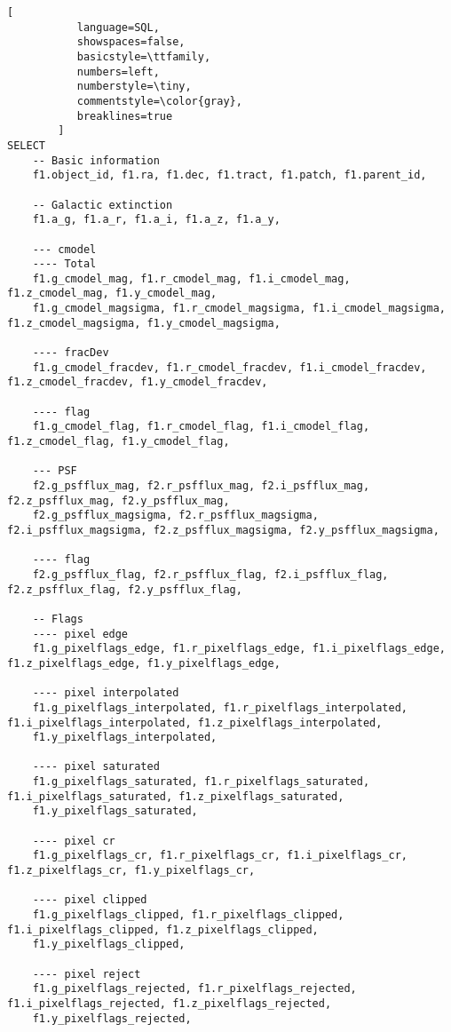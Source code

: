 \documentclass[fleqn,usenatbib,useAMS]{mnras}
\begin{document}
\begin{lstlisting}[
           language=SQL,
           showspaces=false,
           basicstyle=\ttfamily,
           numbers=left,
           numberstyle=\tiny,
           commentstyle=\color{gray},
           breaklines=true
        ]
SELECT
    -- Basic information
    f1.object_id, f1.ra, f1.dec, f1.tract, f1.patch, f1.parent_id,
    
    -- Galactic extinction
    f1.a_g, f1.a_r, f1.a_i, f1.a_z, f1.a_y,
    
    --- cmodel
    ---- Total
    f1.g_cmodel_mag, f1.r_cmodel_mag, f1.i_cmodel_mag, f1.z_cmodel_mag, f1.y_cmodel_mag,
    f1.g_cmodel_magsigma, f1.r_cmodel_magsigma, f1.i_cmodel_magsigma, f1.z_cmodel_magsigma, f1.y_cmodel_magsigma,

    ---- fracDev
    f1.g_cmodel_fracdev, f1.r_cmodel_fracdev, f1.i_cmodel_fracdev, f1.z_cmodel_fracdev, f1.y_cmodel_fracdev,

    ---- flag
    f1.g_cmodel_flag, f1.r_cmodel_flag, f1.i_cmodel_flag, f1.z_cmodel_flag, f1.y_cmodel_flag,

    --- PSF
    f2.g_psfflux_mag, f2.r_psfflux_mag, f2.i_psfflux_mag, f2.z_psfflux_mag, f2.y_psfflux_mag,
    f2.g_psfflux_magsigma, f2.r_psfflux_magsigma, f2.i_psfflux_magsigma, f2.z_psfflux_magsigma, f2.y_psfflux_magsigma,

    ---- flag
    f2.g_psfflux_flag, f2.r_psfflux_flag, f2.i_psfflux_flag, f2.z_psfflux_flag, f2.y_psfflux_flag,

    -- Flags
    ---- pixel edge
    f1.g_pixelflags_edge, f1.r_pixelflags_edge, f1.i_pixelflags_edge, f1.z_pixelflags_edge, f1.y_pixelflags_edge,

    ---- pixel interpolated
    f1.g_pixelflags_interpolated, f1.r_pixelflags_interpolated, f1.i_pixelflags_interpolated, f1.z_pixelflags_interpolated,
    f1.y_pixelflags_interpolated,

    ---- pixel saturated
    f1.g_pixelflags_saturated, f1.r_pixelflags_saturated, f1.i_pixelflags_saturated, f1.z_pixelflags_saturated,
    f1.y_pixelflags_saturated,

    ---- pixel cr
    f1.g_pixelflags_cr, f1.r_pixelflags_cr, f1.i_pixelflags_cr, f1.z_pixelflags_cr, f1.y_pixelflags_cr,

    ---- pixel clipped
    f1.g_pixelflags_clipped, f1.r_pixelflags_clipped, f1.i_pixelflags_clipped, f1.z_pixelflags_clipped,
    f1.y_pixelflags_clipped,

    ---- pixel reject
    f1.g_pixelflags_rejected, f1.r_pixelflags_rejected, f1.i_pixelflags_rejected, f1.z_pixelflags_rejected,
    f1.y_pixelflags_rejected,


\end{lstlisting}
\end{document}
